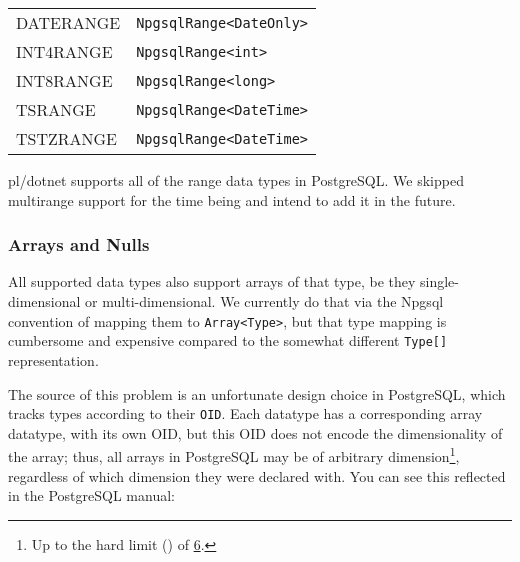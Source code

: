 \documentclass[sigconf,techreport,authorversion,nonacm]{acmart}
\begin{document}
\begin{table}[!htbp]
\begin{tabular}{l | l}
                DATERANGE                              & \texttt{NpgsqlRange<DateOnly>}          \\
                INT4RANGE                              & \texttt{NpgsqlRange<int>}               \\
                INT8RANGE                              & \texttt{NpgsqlRange<long>}              \\
                TSRANGE                                & \texttt{NpgsqlRange<DateTime>}          \\
                TSTZRANGE                              & \texttt{NpgsqlRange<DateTime>}          \\ \bottomrule
        \end{tabular}
\end{table}

pl/dotnet supports all of the range data types in PostgreSQL.
We skipped multirange support for the time being and intend
to add it in the future.

\subsubsection{Arrays and Nulls}

All supported data types also support arrays of that type, be they
single-dimensional or multi-dimensional. We currently do that via
the Npgsql convention of mapping them to \texttt{Array<Type>}, but
that type mapping is cumbersome and expensive compared to the
somewhat different \texttt{Type[]} representation.

The source of this problem is an unfortunate design choice in
PostgreSQL, which tracks types according to their \texttt{OID}.
Each datatype has a corresponding array datatype, with its own OID,
but this OID does not encode the dimensionality of the array; thus,
all arrays in PostgreSQL may be of arbitrary dimension\footnote{Up
to the hard limit () of \href{https://github.com/postgres/postgres/blob/master/src/include/utils/array.h\#L75}{6}.},
regardless of which dimension they were declared with. You can see
this reflected in the PostgreSQL manual:

\captionsetup[figure]{labelformat=empty}
\end{document}
